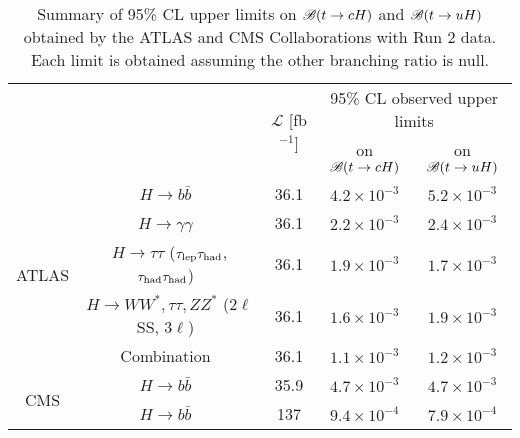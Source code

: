 \begin{table}[t!]
\caption{\small{Summary of 95\% CL upper limits on $\mathscr{B}(t \to cH)$ and $\mathscr{B}(t \to uH)$ obtained by the ATLAS and CMS Collaborations with Run 2 data. Each limit is obtained assuming the other branching ratio is null.}}
\begin{center}
\small 
\begin{tabular}{ccccc}
\toprule\toprule
& &\multirow{2}{*}{$\mathcal{L}$ [fb$^{-1}$]} & \multicolumn{2}{c}{95\% CL observed upper limits}  \\
& & 										    & \multicolumn{1}{c}{on $\mathscr{B}(t \to cH)$}            & \multicolumn{1}{c}{on $\mathscr{B}(t \to uH)$} \\
\midrule
\multirow{5}{*}{ATLAS}
& $H \to b\bar{b}$~\cite{fcnc36}                                          & 36.1         & $4.2 \times 10^{-3}$ & $5.2 \times 10^{-3}$ \\
& $H \to \gamma\gamma$~\cite{Aaboud:2017mfd}                              & 36.1         & $2.2 \times 10^{-3}$  & $2.4 \times 10^{-3}$  \\
& $H \to \tau\tau$ ($\tau_{\mathrm{lep}} \tau_{\mathrm{had}}$, $\tau_{\mathrm{had}} \tau_{\mathrm{had}}$)~\cite{fcnc36}                   & 36.1         & $1.9 \times 10^{-3}$  & $1.7 \times 10^{-3}$  \\ 
& $H \to WW^*, \tau\tau, ZZ^*$ ($2\ell$SS, $3\ell$)~\cite{Aaboud:2018pob} & 36.1         & $1.6 \times 10^{-3}$  & $1.9 \times 10^{-3}$\\ 
& Combination~\cite{fcnc36}                                               & 36.1         & $1.1 \times 10^{-3}$  & $1.2 \times 10^{-3}$  \\\midrule
\multirow{2}{*}{CMS} 
& $H \to b\bar{b}$~\cite{Sirunyan:2017uae}                                & 35.9         & $4.7 \times 10^{-3}$  & $4.7 \times 10^{-3}$  \\
& $H \to b\bar{b}$~\cite{CMS:2021gfa}                                     & 137          & $9.4 \times 10^{-4}$  & $7.9 \times 10^{-4}$  \\
% 
\bottomrule\bottomrule
\end{tabular}
\label{tab:limits_summary_ref}
\end{center}
\end{table}





